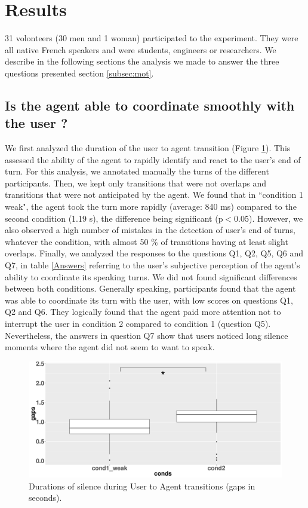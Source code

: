 \section{Results}

31 volonteers (30 men and 1 woman) participated to the experiment. They were all native French speakers and were students, engineers or researchers. We describe in the following sections the analysis we made to answer the three questions presented section \ref{subsec:mot}.

\subsection{Is the agent able to coordinate smoothly with the user ?}

We first analyzed the duration of the user to agent transition (Figure \ref{box_ua}). This assessed the ability of the agent to rapidly identify and react to the user's end of turn. For this analysis, we annotated manually the turns of the different participants. Then, we kept only transitions that were not overlaps and transitions that were not anticipated by the agent.  We found that in ``condition 1 weak", the agent took the turn more rapidly (average: 840 ms) compared to the second condition (1.19 s), the difference being significant (p$<$0.05). However, we also observed a high number of mistakes in the detection of user's end of turns, whatever the condition, with almost 50 \% of transitions having at least slight overlaps.  
Finally, we analyzed the responses to the questions Q1, Q2, Q5, Q6 and Q7, in table \ref{Answers} referring to the user's subjective perception of the agent's ability to coordinate its speaking turns. We did not found significant differences between both conditions. Generally speaking, participants found that the agent was able to coordinate its turn with the user, with low scores on questions Q1, Q2 and Q6. They logically found that the agent paid more attention not to interrupt the user in condition 2 compared to condition 1 (question Q5). Nevertheless, the answers in question Q7 show that users noticed long silence moments where the agent did not seem to want to speak. 
 
\begin{figure}
\centering
\includegraphics[width=\linewidth]{figure/boxTransitionsUA.pdf}
\caption{Durations of silence during User to Agent transitions (gaps in seconds).}
\label{box_ua}
\end{figure}
  
